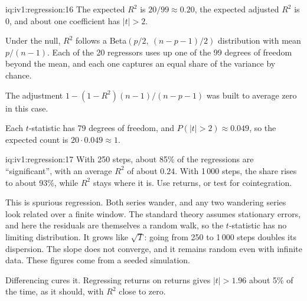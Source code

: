 \begin{solution}{iq:iv1:regression:16}
The expected $R^2$ is $20/99 \approx 0.20$, the expected adjusted $R^2$ is 0, and about one coefficient has $|t| > 2$.

Under the null, $R^2$ follows a Beta$(p/2,\ (n - p - 1)/2)$ distribution with mean $p/(n - 1)$. Each of the 20 regressors uses up one of the 99 degrees of freedom beyond the mean, and each one captures an equal share of the variance by chance.

The adjustment $1 - (1 - R^2)(n - 1)/(n - p - 1)$ was built to average zero in this case.

Each $t$-statistic has 79 degrees of freedom, and $P(|t| > 2) \approx 0.049$, so the expected count is $20 \cdot 0.049 \approx 1$.

\end{solution}

\begin{solution}{iq:iv1:regression:17}
With 250 steps, about 85\% of the regressions are ``significant'', with an average $R^2$ of about $0.24$. With 1\,000 steps, the share rises to about 93\%, while $R^2$ stays where it is. Use returns, or test for cointegration.

This is spurious regression. Both series wander, and any two wandering series look related over a finite window. The standard theory assumes stationary errors, and here the residuals are themselves a random walk, so the $t$-statistic has no limiting distribution. It grows like $\sqrt{T}$: going from 250 to 1\,000 steps doubles its dispersion. The slope does not converge, and it remains random even with infinite data. These figures come from a seeded simulation.

Differencing cures it. Regressing returns on returns gives $|t| > 1.96$ about 5\% of the time, as it should, with $R^2$ close to zero.

\end{solution}

